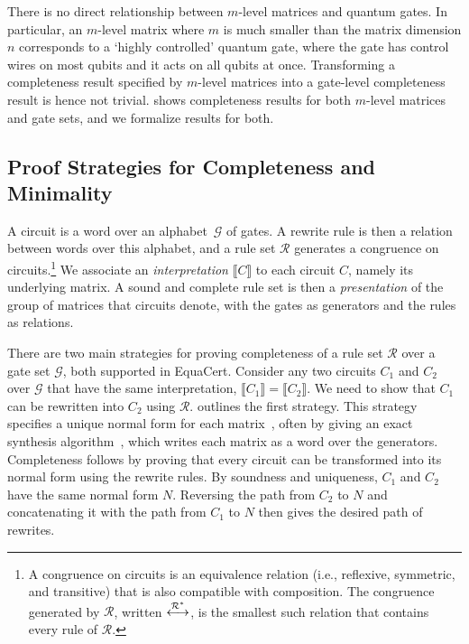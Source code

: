 \documentclass[acmsmall,screen,nonacm]{acmart}
\begin{document}
There is no direct relationship between $m$-level matrices and quantum gates. In particular, an $m$-level matrix where $m$ is much smaller than the matrix dimension $n$ corresponds to a `highly controlled' quantum gate, where the gate has control wires on most qubits and it acts on all qubits at once. Transforming a completeness result specified by $m$-level matrices into a gate-level completeness result is hence not trivial.
 shows completeness results for both $m$-level matrices and gate sets, and we formalize results for both.

\subsection{Proof Strategies for Completeness and Minimality}\label{sec:strategies}
A circuit is a word over an alphabet~$\mathcal{G}$ of gates. A rewrite rule is then a relation between words over this alphabet, and a rule set $\mathcal{R}$ generates a congruence on circuits.\footnote{A congruence on circuits is an equivalence relation (i.e., reflexive, symmetric, and transitive) that is also compatible with composition. The congruence generated by $\mathcal{R}$, written $\overset{\mathcal{R}^{*}}{\longleftrightarrow}$, is the smallest such relation that contains every rule of $\mathcal{R}$.} We associate an \emph{interpretation} $\llbracket C \rrbracket$ to each circuit $C$, namely its underlying matrix. A sound and complete rule set is then a \emph{presentation} of the group of matrices that circuits denote, with the gates as generators and the rules as relations. 

There are two main strategies for proving completeness of a rule set $\mathcal{R}$ over a gate set $\mathcal{G}$, both supported in EquaCert. Consider any two circuits $C_1$ and $C_2$ over $\mathcal{G}$ that have the same interpretation, $\llbracket C_1\rrbracket = \llbracket C_2 \rrbracket$. We need to show that $C_1$ can be rewritten into $C_2$ using $\mathcal{R}$.  outlines the first strategy. This strategy specifies a unique normal form for each matrix~\cite{lafont2003boolean,sakashita2013cnot,feng2026complete,selinger2015clifford,bian2026qupit,makary2021real,amy2018cnotdihedral,blake2026phaseaffine,li2025qutrit}, often by giving an exact synthesis algorithm~\cite{greylyn2014,bian2021un,li2021on,fang2026hadamard,clement2019thesis}, which writes each matrix as a word over the generators. Completeness follows by proving that every circuit can be transformed into its normal form using the rewrite rules. By soundness and uniqueness, $C_1$ and $C_2$ have the same normal form $N$. Reversing the path from $C_2$ to $N$ and concatenating it with the path from $C_1$ to $N$ then gives the desired path of rewrites.
\end{document}
